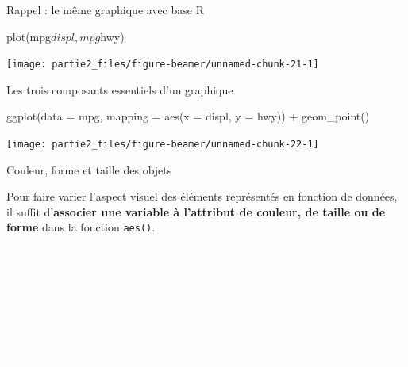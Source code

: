 \documentclass[12pt,ignorenonframetext,]{beamer}
\newenvironment{Shaded}{}{}
\newcommand{\KeywordTok}[1]{\textcolor[rgb]{0.00,0.00,1.00}{#1}}
\newcommand{\DataTypeTok}[1]{#1}
\newcommand{\StringTok}[1]{\textcolor[rgb]{0.00,0.50,0.50}{#1}}
\newcommand{\OperatorTok}[1]{#1}
\newcommand{\NormalTok}[1]{#1}
\renewenvironment{Shaded}{\begin{snugshade}}{\end{snugshade}}
\begin{document}
\begin{frame}[fragile]{\large Rappel : le même graphique avec base R}

\centering \footnotesize

\begin{Shaded}
\begin{Highlighting}[]
\KeywordTok{plot}\NormalTok{(mpg}\OperatorTok{$}\NormalTok{displ, mpg}\OperatorTok{$}\NormalTok{hwy)}
\end{Highlighting}
\end{Shaded}

\texttt{[image: partie2\_files/figure-beamer/unnamed-chunk-21-1]}

\end{frame}

\begin{frame}[fragile]{\large Les trois composants essentiels d'un
graphique}

\center \small 

\begin{Shaded}
\begin{Highlighting}[]
\KeywordTok{ggplot}\NormalTok{(}\DataTypeTok{data =}\NormalTok{ mpg, }\DataTypeTok{mapping =} \KeywordTok{aes}\NormalTok{(}\DataTypeTok{x =}\NormalTok{ displ, }\DataTypeTok{y =}\NormalTok{ hwy)) }\OperatorTok{+}
\StringTok{  }\KeywordTok{geom_point}\NormalTok{()}
\end{Highlighting}
\end{Shaded}

\texttt{[image: partie2\_files/figure-beamer/unnamed-chunk-22-1]}

\end{frame}

\begin{frame}{Couleur, forme et taille des objets}

Pour faire varier l'aspect visuel des éléments représentés en fonction
de données, il suffit
d'\textbf{associer une variable à l'attribut de couleur, de taille ou de forme}
dans la fonction \texttt{aes()}.

\textcolor{white}{Selon le type des variables utilisées pour les correspondances esthétiques, \textbf{les échelles sont continues ou discrètes}.}

\textcolor{white}{Quand la même variable est utilisée dans plusieurs correspondances esthétiques, \textbf{les échelles qui lui correspondent sont fusionnées}.}

\textcolor{white}{Au-delà des correspondances esthétiques dans la fonction \texttt{aes()}, \textbf{l'aspect visuel peut être ajusté directement dans la fonction \texttt{geom\_*}}.}

\end{frame}
\end{document}
